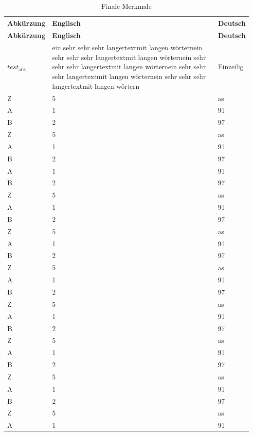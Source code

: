 \documentclass[
12pt, %
toc=listofnumbered, %
toc=chapterentrydotfill, %
numbers=noenddot, %
captions=tableheading, %
bibliography=numbered
]{scrreprt}
\begin{document}
\begin{longtable}{|L{3.6cm}|L{6cm}|L{6cm}|}
	\caption{Finale Merkmale}\label{tab:longtable}\\
	\hline
	\textbf{Abkürzung}&\textbf{Englisch}&\textbf{Deutsch}\\
	\hline
	\endfirsthead %
	\hline
	\textbf{Abkürzung}&\textbf{Englisch}&\textbf{Deutsch}\\
	\hline
	\endhead %
    \hline
    \endfoot
    \hline
    \endlastfoot
	$test_{\mathrm{abk}}$&ein sehr sehr sehr langertextmit langen wörternein sehr sehr sehr langertextmit langen wörternein sehr sehr sehr langertextmit langen wörternein sehr sehr sehr langertextmit langen wörternein sehr sehr sehr langertextmit langen wörtern&Einzeilig\\
	Z&5&as\\\hline
	A&1&91\\\hline
	B&2&97\\\hline
	Z&5&as\\\hline
	A&1&91\\\hline
	B&2&97\\\hline
	A&1&91\\\hline
	B&2&97\\\hline
	Z&5&as\\\hline
	A&1&91\\\hline
	B&2&97\\\hline
    Z&5&as\\\hline
	A&1&91\\\hline
	B&2&97\\\hline
	Z&5&as\\\hline
	A&1&91\\\hline
	B&2&97\\\hline
    Z&5&as\\\hline
	A&1&91\\\hline
	B&2&97\\\hline
	Z&5&as\\\hline
	A&1&91\\\hline
	B&2&97\\\hline
    Z&5&as\\\hline
	A&1&91\\\hline
	B&2&97\\\hline
	Z&5&as\\\hline
	A&1&91\\\hline

\end{longtable}
\end{document}
